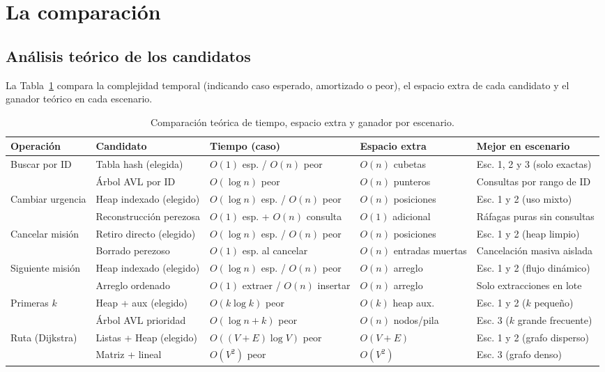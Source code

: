 \documentclass[11pt,a4paper]{article}
\begin{document}
\section{La comparación}

\subsection{Análisis teórico de los candidatos}

La Tabla~\ref{tab:complejidades_candidatos} compara la complejidad temporal (indicando caso esperado, amortizado o peor), el espacio extra de cada candidato y el ganador teórico en cada escenario.

\begin{table}[htbp]
\centering
\caption{Comparación teórica de tiempo, espacio extra y ganador por escenario.}
\label{tab:complejidades_candidatos}
\small
\begin{tabular}{p{2.3cm} p{3.2cm} p{2.9cm} p{2.2cm} p{3.5cm}}
\toprule
\textbf{Operación} & \textbf{Candidato} & \textbf{Tiempo (caso)} & \textbf{Espacio extra} & \textbf{Mejor en escenario} \\
\midrule
Buscar por ID & Tabla hash (elegida) & $O(1)$ esp. / $O(n)$ peor & $O(n)$ cubetas & Esc. 1, 2 y 3 (solo exactas) \\
              & Árbol AVL por ID & $O(\log n)$ peor & $O(n)$ punteros & Consultas por rango de ID \\
\addlinespace
Cambiar urgencia & Heap indexado (elegido) & $O(\log n)$ esp. / $O(n)$ peor & $O(n)$ posiciones & Esc. 1 y 2 (uso mixto) \\
                 & Reconstrucción perezosa & $O(1)$ esp. + $O(n)$ consulta & $O(1)$ adicional & Ráfagas puras sin consultas \\
\addlinespace
Cancelar misión & Retiro directo (elegido) & $O(\log n)$ esp. / $O(n)$ peor & $O(n)$ posiciones & Esc. 1 y 2 (heap limpio) \\
                & Borrado perezoso & $O(1)$ esp. al cancelar & $O(n)$ entradas muertas & Cancelación masiva aislada \\
\addlinespace
Siguiente misión & Heap indexado (elegido) & $O(\log n)$ esp. / $O(n)$ peor & $O(n)$ arreglo & Esc. 1 y 2 (flujo dinámico) \\
                 & Arreglo ordenado & $O(1)$ extraer / $O(n)$ insertar & $O(n)$ arreglo & Solo extracciones en lote \\
\addlinespace
Primeras $k$ & Heap + aux (elegido) & $O(k \log k)$ peor & $O(k)$ heap aux. & Esc. 1 y 2 ($k$ pequeño) \\
             & Árbol AVL prioridad & $O(\log n + k)$ peor & $O(n)$ nodos/pila & Esc. 3 ($k$ grande frecuente) \\
\addlinespace
Ruta (Dijkstra) & Listas + Heap (elegido) & $O((V+E)\log V)$ peor & $O(V+E)$ & Esc. 1 y 2 (grafo disperso) \\
                & Matriz + lineal & $O(V^2)$ peor & $O(V^2)$ & Esc. 3 (grafo denso) \\
\bottomrule
\end{tabular}
\end{table}
\end{document}
